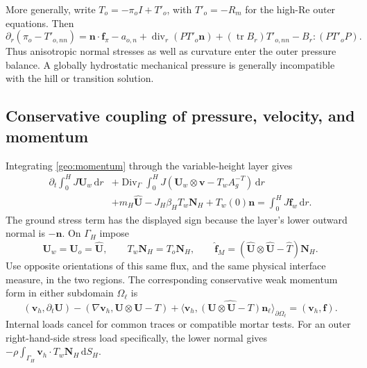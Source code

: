 \documentclass[11pt,a4paper]{article}
\numberwithin{equation}{section}
\newcommand{\dd}{\mathrm d}
\begin{document}
More generally, write $T_o=-\pi_oI+T'_o$, with
$T'_o=-R_m$ for the high-Re outer equations.  Then
\begin{equation}
 \partial_r(\pi_o-T'_{o,nn})
 =\boldsymbol n\cdot\boldsymbol f_\pi-a_{o,n}
  +\operatorname{div}_r(P T'_o\boldsymbol n)
  +(\operatorname{tr}B_r)T'_{o,nn}-B_r:(PT'_oP).
 \label{geo:outer-normal-pressure}
\end{equation}
Thus anisotropic normal stresses as well as curvature enter the
outer pressure balance.  A globally hydrostatic mechanical pressure
is generally incompatible with the hill or transition solution.

\subsection{Conservative coupling of pressure, velocity, and momentum}

Integrating \cref{geo:momentum} through the variable-height layer
gives
\begin{equation}
 \begin{aligned}
 \partial_t\int_0^H J\boldsymbol U_w\,\dd r
 &+\operatorname{Div}_\Gamma\int_0^H
   J(\boldsymbol U_w\otimes\boldsymbol v-T_wA_g^{-T})\,\dd r\\
 &+m_H\widehat{\boldsymbol U}
  -J_H\beta_HT_w\boldsymbol N_H+T_w(0)\boldsymbol n
 =\int_0^H J\boldsymbol f_w\,\dd r .
 \end{aligned}
 \label{geo:integrated-momentum}
\end{equation}
The ground stress term has the displayed sign because the layer's
lower outward normal is $-\boldsymbol n$.  On $\Gamma_H$ impose
\begin{equation}
 \boldsymbol U_w=\boldsymbol U_o=\widehat{\boldsymbol U},\qquad
 T_w\boldsymbol N_H=T_o\boldsymbol N_H,\qquad
 \widehat{\boldsymbol f}_M=
 (\widehat{\boldsymbol U}\otimes\widehat{\boldsymbol U}
                         -\widehat T)\boldsymbol N_H .
 \label{geo:interface-momentum}
\end{equation}
Use opposite orientations of this same flux, and the same physical
interface measure, in the two regions.  The corresponding conservative
weak momentum form in either subdomain $\Omega_\ell$ is
\begin{equation}
 (\boldsymbol v_h,\partial_t\boldsymbol U)
 -(\nabla\boldsymbol v_h,\boldsymbol U\otimes\boldsymbol U-T)
 +\langle\boldsymbol v_h,
        \widehat{(\boldsymbol U\otimes\boldsymbol U-T)}
        \boldsymbol n_\ell\rangle_{\partial\Omega_\ell}
 =(\boldsymbol v_h,\boldsymbol f).
 \label{geo:momentum-weak}
\end{equation}
Internal loads cancel for common traces or compatible mortar tests.
For an outer right-hand-side stress load specifically, the lower
normal gives $-\rho\int_{\Gamma_H}\boldsymbol v_h\cdot
T_w\boldsymbol N_H\,\dd S_H$.
\end{document}
